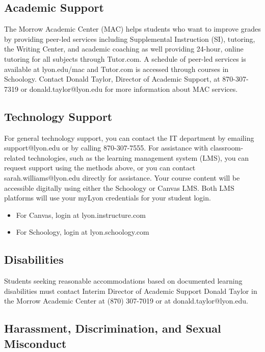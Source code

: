 \documentclass[11pt]{article}
\begin{document}
\subsection{Academic Support}
\label{sec:org7051595}

The Morrow Academic Center (MAC) helps students who want to improve
grades by providing peer-led services including Supplemental
Instruction (SI), tutoring, the Writing Center, and academic coaching
as well providing 24-hour, online tutoring for all subjects through
Tutor.com. A schedule of peer-led services is available at
lyon.edu/mac and Tutor.com is accessed through courses in
Schoology. Contact Donald Taylor, Director of Academic Support, at
870-307-7319 or donald.taylor@lyon.edu for more information about MAC
services.

\subsection{Technology Support}
\label{sec:org8161210}

For general technology support, you can contact the IT department by
emailing support@lyon.edu or by calling 870-307-7555. For assistance
with classroom-related technologies, such as the learning management
system (LMS), you can request support using the methods above, or you
can contact sarah.williams@lyon.edu directly for assistance. Your
course content will be accessible digitally using either the Schoology
or Canvas LMS. Both LMS platforms will use your myLyon credentials for
your student login.

\begin{itemize}
\item For Canvas, login at lyon.instructure.com
\item For Schoology, login at lyon.schoology.com
\end{itemize}

\subsection{Disabilities}
\label{sec:orga69f281}

Students seeking reasonable accommodations based on documented
learning disabilities must contact Interim Director of Academic
Support Donald Taylor in the Morrow Academic Center at (870) 307-7019
or at donald.taylor@lyon.edu.

\subsection{Harassment, Discrimination, and Sexual Misconduct}
\label{sec:org3f2bec7}
\end{document}
